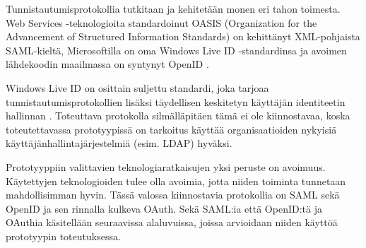 Tunnistautumisprotokollia tutkitaan ja kehitetään monen eri tahon toimesta. Web Services -teknologioita standardoinut OASIS (Organization for the Advancement of Structured Information Standards) on kehittänyt XML-pohjaista SAML-kieltä, Microsoftilla on oma Windows Live ID -standardinsa ja avoimen lähdekoodin maailmassa on syntynyt OpenID \cite{open_identity}.

Windows Live ID on osittain suljettu standardi, joka tarjoaa tunnistautumisprotokollien lisäksi täydellisen keskitetyn käyttäjän identiteetin hallinnan \cite{open_identity}. Toteuttava protokolla silmälläpitäen tämä ei ole kiinnostavaa, koska toteutettavassa prototyypissä on tarkoitus käyttää organisaatioiden nykyisiä käyttäjänhallintajärjestelmiä (esim. LDAP) hyväksi.

Prototyyppiin valittavien teknologiaratkaisujen yksi peruste on avoimuus. Käytettyjen teknologioiden tulee olla avoimia, jotta niiden toiminta tunnetaan mahdollisimman hyvin. Tässä valossa kiinnostavia protokollia on SAML sekä OpenID ja sen rinnalla kulkeva OAuth. Sekä SAML:ia että OpenID:tä ja OAuthia käsitellään seuraavissa alaluvuissa, joissa arvioidaan niiden käyttöä prototyypin toteutuksessa.